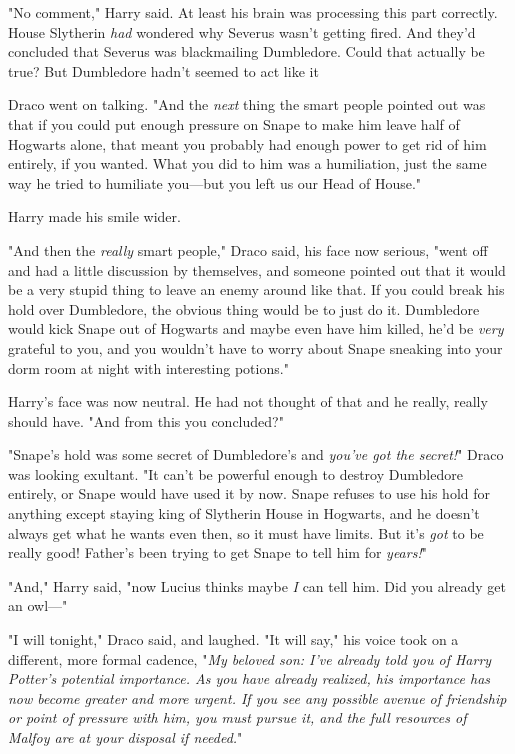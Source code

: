 "No comment," Harry said. At least his brain was processing this part
correctly. House Slytherin \emph{had} wondered why Severus wasn't getting
fired. And they'd concluded that Severus was blackmailing Dumbledore. Could
that actually be true\el? But Dumbledore hadn't seemed to act like
it{\el}

Draco went on talking. "And the \emph{next} thing the smart people pointed out
was that if you could put enough pressure on Snape to make him leave half of
Hogwarts alone, that meant you probably had enough power to get rid of him
entirely, if you wanted. What you did to him was a humiliation, just the same
way he tried to humiliate you---but you left us our Head of House."

Harry made his smile wider.

"And then the \emph{really} smart people," Draco said, his face now serious,
"went off and had a little discussion by themselves, and someone pointed out
that it would be a very stupid thing to leave an enemy around like that. If you
could break his hold over Dumbledore, the obvious thing would be to just do it.
Dumbledore would kick Snape out of Hogwarts and maybe even have him killed,
he'd be \emph{very} grateful to you, and you wouldn't have to worry about Snape
sneaking into your dorm room at night with interesting potions."

Harry's face was now neutral. He had not thought of that and he really, really
should have. "And from this you concluded\el?"

"Snape's hold was some secret of Dumbledore's and \emph{you've got the
secret!}" Draco was looking exultant. "It can't be powerful enough to destroy
Dumbledore entirely, or Snape would have used it by now. Snape refuses to use
his hold for anything except staying king of Slytherin House in Hogwarts, and
he doesn't always get what he wants even then, so it must have limits. But it's
\emph{got} to be really good! Father's been trying to get Snape to tell him for
\emph{years!}"

"And," Harry said, "now Lucius thinks maybe \emph{I} can tell him. Did you
already get an owl---"

"I will tonight," Draco said, and laughed. "It will say," his voice took on a
different, more formal cadence, "\emph{My beloved son: I've already told you of
Harry Potter's potential importance. As you have already realized, his
importance has now become greater and more urgent. If you see any possible
avenue of friendship or point of pressure with him, you must pursue it, and the
full resources of Malfoy are at your disposal if needed.}"

